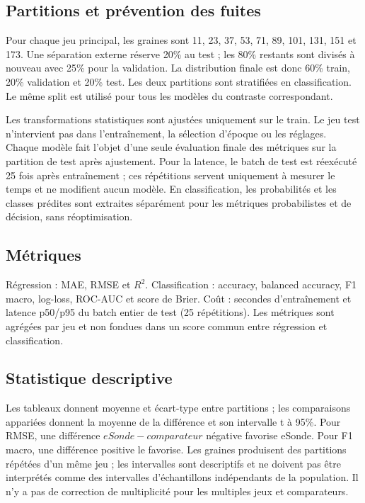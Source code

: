 \documentclass[11pt,a4paper]{article}
\begin{document}
\subsection{Partitions et prévention des fuites}
Pour chaque jeu principal, les graines sont 11, 23, 37, 53, 71, 89, 101, 131, 151 et 173. Une séparation externe réserve 20\% au test ; les 80\% restants sont divisés à nouveau avec 25\% pour la validation. La distribution finale est donc 60\% train, 20\% validation et 20\% test. Les deux partitions sont stratifiées en classification. Le même split est utilisé pour tous les modèles du contraste correspondant.

Les transformations statistiques sont ajustées uniquement sur le train. Le jeu test n'intervient pas dans l'entraînement, la sélection d'époque ou les réglages. Chaque modèle fait l'objet d'une seule évaluation finale des métriques sur la partition de test après ajustement. Pour la latence, le batch de test est réexécuté 25 fois après entraînement ; ces répétitions servent uniquement à mesurer le temps et ne modifient aucun modèle. En classification, les probabilités et les classes prédites sont extraites séparément pour les métriques probabilistes et de décision, sans réoptimisation.

\subsection{Métriques}
Régression : MAE, RMSE et $R^2$. Classification : accuracy, balanced accuracy, F1 macro, log-loss, ROC-AUC et score de Brier. Coût : secondes d'entraînement et latence p50/p95 du batch entier de test (25 répétitions). Les métriques sont agrégées par jeu et non fondues dans un score commun entre régression et classification.

\subsection{Statistique descriptive}
Les tableaux donnent moyenne et écart-type entre partitions ; les comparaisons appariées donnent la moyenne de la différence et son intervalle t à 95\%. Pour RMSE, une différence $eSonde - comparateur$ négative favorise eSonde. Pour F1 macro, une différence positive le favorise. Les graines produisent des partitions répétées d'un même jeu ; les intervalles sont descriptifs et ne doivent pas être interprétés comme des intervalles d'échantillons indépendants de la population. Il n'y a pas de correction de multiplicité pour les multiples jeux et comparateurs.
\end{document}
